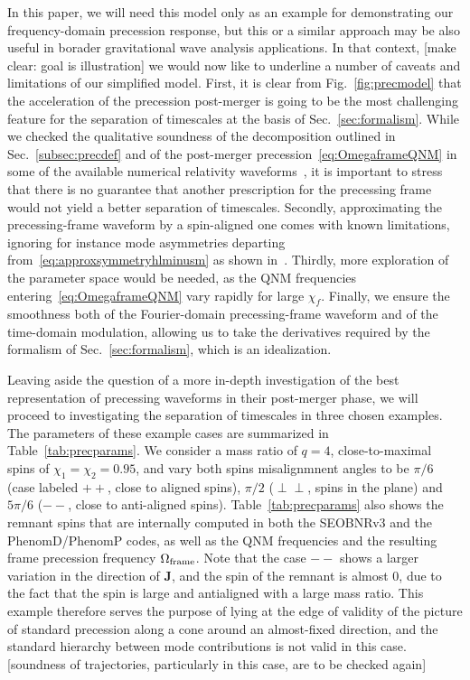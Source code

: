 \documentclass[aps,showpacs,twocolumn,
prd,superscriptaddress,nofootinbib]{revtex4-1}
\newcommand{\SM}[1]{{\color{Red} #1}}
\newcommand{\jgb}[1]{{\color{DarkGreen} #1}}
\begin{document}
\jgb{In this paper, we will need this model only as an example for demonstrating our frequency-domain precession response, but this or a similar approach may be also useful in borader gravitational wave analysis applications. In that context,} \SM{[make clear: goal is illustration]}
we would now like to underline a number of caveats and limitations of our simplified model. First, it is clear from Fig.~\ref{fig:precmodel} that the acceleration of the precession post-merger is going to be the most challenging feature for the separation of timescales at the basis of Sec.~\ref{sec:formalism}. While we checked the qualitative soundness of the decomposition outlined in Sec.~\ref{subsec:precdef} and of the post-merger precession~\eqref{eq:OmegaframeQNM} in some of the available numerical relativity waveforms~\cite{SXScatalog}, it is important to stress that there is no guarantee that another prescription for the precessing frame would not yield a better separation of timescales. Secondly, approximating the precessing-frame waveform by a spin-aligned one comes with known limitations, ignoring for instance mode asymmetries departing from~\eqref{eq:approxsymmetryhlminusm} as shown in~\cite{Boyle+14}. Thirdly, more exploration of the parameter space would be needed, as the QNM frequencies entering~\eqref{eq:OmegaframeQNM} vary rapidly for large $\chi_{f}$. Finally, we ensure the smoothness both of the Fourier-domain precessing-frame waveform and of the time-domain modulation, allowing us to take the derivatives required by the formalism of Sec.~\ref{sec:formalism}, which is an idealization.

Leaving aside the question of a more in-depth investigation of the best representation of precessing waveforms in their post-merger phase, we will proceed to investigating the separation of timescales in three chosen examples. The parameters of these example cases are summarized in Table~\ref{tab:precparams}. We consider a mass ratio of $q=4$, close-to-maximal spins of $\chi_{1} = \chi_{2} = 0.95$, and vary both spins misalignmnent angles to be $\pi/6$ (case labeled $++$, close to aligned spins), $\pi/2$ ($\perp\perp$, spins in the plane) and $5\pi/6$ ($--$, close to anti-aligned spins). Table~\ref{tab:precparams} also shows the remnant spins that are internally computed in both the SEOBNRv3 and the PhenomD/PhenomP codes, as well as the QNM frequencies and the resulting frame precession frequency $\Omega_{\rm frame}$. Note that the case $--$ shows a larger variation in the direction of $\bm{J}$, and the spin of the remnant is almost 0, due to the fact that the spin is large and antialigned with a large mass ratio. This example therefore serves the purpose of lying at the edge of validity of the picture of standard precession along a cone around an almost-fixed direction, and the standard hierarchy between mode contributions is not valid in this case. \SM{[soundness of trajectories, particularly in this case, are to be checked again]}
\end{document}
